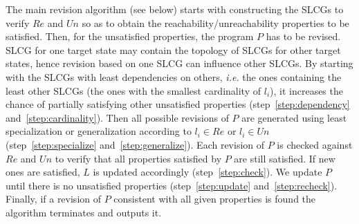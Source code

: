     

    
    The main revision algorithm (see below) starts with constructing the SLCGs to verify $Re$ and $Un$ so as to obtain the reachability/unreachability properties to be satisfied.
    Then, for the unsatisfied properties, the program $P$ has to be revised.
    SLCG for one target state may contain the topology of SLCGs for other target states, hence revision based on one SLCG can influence other SLCGs.
    By starting with the SLCGs with least dependencies on others, \textit{i.e.} the ones containing the least other SLCGs (the ones with the smallest cardinality of $l_i$), it increases the chance of partially satisfying other unsatisfied properties (step~\ref{step:dependency} and~\ref{step:cardinality}). 
    Then all possible revisions of $P$ are generated using least specialization or generalization according to $l_i\in Re$ or $l_i \in Un$ (step~\ref{step:specialize} and~\ref{step:generalize}). 
    Each revision of $P$ is checked against $Re$ and $Un$ to verify that all properties satisfied by $P$ are still satisfied. 
    If new ones are satisfied, $L$ is updated accordingly (step~\ref{step:check}).
    We update $P$ until there is no unsatisfied properties (step~\ref{step:update} and~\ref{step:recheck}).
    Finally, if a revision of $P$ consistent with all given properties is found the algorithm terminates and outputs it.
    
